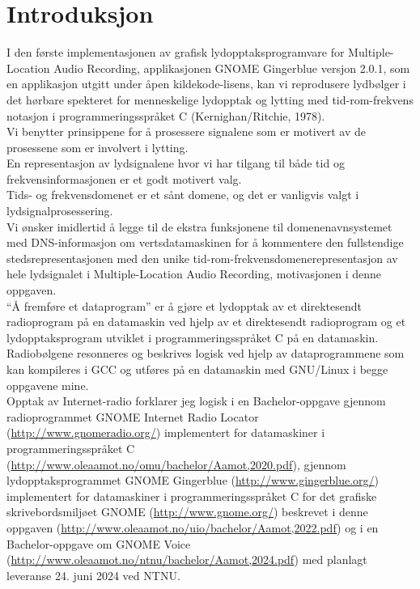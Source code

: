 \documentclass[UKenglish]{ifimaster}  %
\begin{document}
\tableofcontents{}

\mainmatter{}

\chapter*{Introduksjon}                    %

I den første implementasjonen av grafisk lydopptaksprogramvare for
Multiple-Location Audio Recording, applikasjonen GNOME Gingerblue
versjon 2.0.1, som en applikasjon utgitt under åpen kildekode-lisens,
kan vi reprodusere lydbølger i det hørbare spekteret for menneskelige
lydopptak og lytting med tid-rom-frekvens notasjon i programmeringsspråket C ({Kernighan/Ritchie, 1978}).\\

Vi benytter prinsippene for å prosessere signalene som er motivert av
de prosessene som er involvert i lytting.\\

En representasjon av lydsignalene hvor vi har tilgang til både tid
og frekvensinformasjonen er et godt motivert valg.\\

Tids- og frekvensdomenet er et sånt domene, og det er vanligvis valgt
i lydsignalprosessering.\\

Vi ønsker imidlertid å legge til de ekstra funksjonene til
domenenavnsystemet med DNS-informasjon om vertsdatamaskinen for å
kommentere den fullstendige stedsrepresentasjonen med den unike
tid-rom-frekvensdomenerepresentasjon av hele lydsignalet i
Multiple-Location Audio Recording, motivasjonen i denne oppgaven.\\

``Å fremføre et dataprogram'' er å gjøre et lydopptak av et direktesendt radioprogram på en datamaskin ved hjelp av et direktesendt radioprogram og et lydopptaksprogram utviklet i programmeringsspråket C på en datamaskin.\\

Radiobølgene resonneres og beskrives logisk ved hjelp av dataprogrammene som kan kompileres i GCC og utføres på en datamaskin med GNU/Linux i begge oppgavene mine.\\

Opptak av Internet-radio forklarer jeg logisk i en Bachelor-oppgave gjennom radioprogrammet GNOME Internet Radio Locator (\url{http://www.gnomeradio.org/}) implementert for datamaskiner i programmeringsspråket C (\url{http://www.oleaamot.no/omu/bachelor/Aamot,2020.pdf}), gjennom lydopptaksprogrammet GNOME Gingerblue (\url{http://www.gingerblue.org/}) implementert for datamaskiner i programmeringsspråket C for det grafiske skrivebordsmiljøet GNOME (\url{http://www.gnome.org/}) beskrevet i denne oppgaven (\url{http://www.oleaamot.no/uio/bachelor/Aamot,2022.pdf}) og i en Bachelor-oppgave om GNOME Voice (\url{http://www.oleaamot.no/ntnu/bachelor/Aamot,2024.pdf}) med planlagt leveranse 24. juni 2024 ved NTNU.\\
\end{document}
